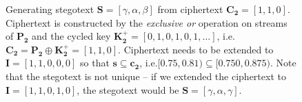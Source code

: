 \documentclass[draft]{IIBproject}
\makeatletter
\DeclareRobustCommand*{\ie}{i.e.\@\xspace}
\newcommand{\interval}[6] {
	\draw[#6] [i] (#1,#2+#4*#3) -- (#1,#2+#5*#3);
}
\newcommand{\intervalBottomLabel}[7] {
	\interval{#1}{#2}{#3}{#4}{#5}{#6}
	\node[#7] at (#1,#2+#4*#3) {\footnotesize #4};
}
\newcommand{\intervalBothLabels}[7] {
	\intervalBottomLabel{#1}{#2}{#3}{#4}{#5}{#6}{#7}
	\node[#7] at (#1,#2+#5*#3) {\footnotesize #5};
}
\makeatother
\begin{document}
\begin{figure}[h]

	\caption{\label{fig:ciphertext_to_stegotext}Generating stegotext $\mathbf S = [\gamma,\alpha,\beta]$ from ciphertext $\mathbf{C_2} = [1,1,0]$. Ciphertext is constructed by the \emph{exclusive or} operation on streams of $\mathbf{P_2}$ and the cycled key $\mathbf{K^+_2} = [0,1,0,1,0,1,\dots]$, \ie $\mathbf {C_2} = \mathbf{P_2} \oplus \mathbf{K^+_2} = [1,1,0]$. Ciphertext needs to be extended to $\mathbf I = [1,1,0,\mathit{0,0}]$ so that $\mathbf s \subseteq \mathbf{c_2}$, \ie $[0.75,0.81) \subseteq [0.750,0.875)$. Note that the stegotext is not unique -- if we extended the ciphertext to $\mathbf I = [1,1,0,\mathit{1,0}]$, the stegotext would be $\mathbf S = [\gamma,\alpha,\gamma]$.}

\end{figure}
\end{document}
